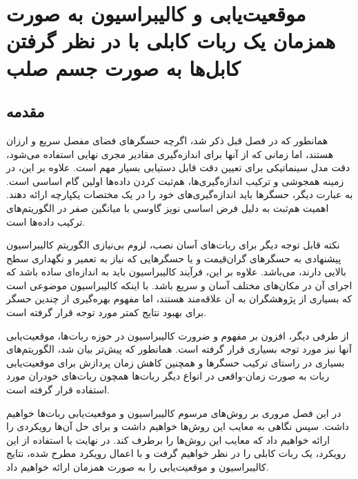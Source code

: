 \chapter{موقعیت‌یابی و کالیبراسیون به صورت همزمان یک ربات کابلی با در نظر گرفتن کابل‌ها به صورت جسم صلب}

\section{مقدمه}
همانطور که در فصل قبل ذکر شد، اگرچه حسگرهای فضای مفصل سریع و ارزان هستند، اما زمانی که از آنها برای اندازه‌گیری مقادیر مجری نهایی استفاده می‌شود، دقت مدل سینماتیکی برای تعیین دقت قابل دستیابی بسیار مهم است. علاوه بر این، در زمینه همجوشی و ترکیب اندازه‌گیری‌ها، هم‌ثبت کردن داده‌ها
\cite{hall1997introduction} 
 اولین گام اساسی است. به عبارت دیگر، حسگرها باید اندازه‌گیری‌های خود را در یک مختصات یکپارچه ارائه دهند. اهمیت هم‌ثبت به دلیل فرض اساسی نویز گاوسی با میانگین صفر در الگوریتم‌های ترکیب داده‌ها است.
 
 نکته قابل توجه دیگر برای ربات‌های آسان نصب، لزوم بی‌نیازی الگوریتم کالیبراسیون پیشنهادی به حسگرهای گران‌قیمت و یا حسگرهایی که نیاز به تعمیر و نگهداری سطح بالایی دارند، می‌باشد. علاوه بر این، فرآیند کالیبراسیون باید به اندازه‌ای ساده باشد که اجرای آن در مکان‌های مختلف آسان و سریع باشد. با اینکه کالیبراسیون موضوعی است که بسیاری از پژوهشگران به آن علاقه‌مند هستند، اما مفهوم بهره‌گیری از چندین حسگر برای بهبود نتایج کمتر مورد توجه قرار گرفته است.
 

از طرفی دیگر، افزون بر مفهوم و ضرورت کالیبراسیون در حوزه ربات‌ها، موقعیت‌یابی آنها نیز مورد توجه بسیاری قرار گرفته است. همانطور که پیش‌تر بیان شد، الگوریتم‌های بسیاری در راستای ترکیب حسگرها و همچنین کاهش زمان پردازش برای موقعیت‌یابی ربات به صورت زمان-واقعی در انواع دیگر ربات‌ها همچون ربات‌های خودران مورد استفاده قرار گرفته است.

در این فصل مروری بر روش‌های مرسوم کالیبراسیون و موقعیت‌یابی ربات‌ها خواهیم داشت. سپس نگاهی به معایب این روش‌ها خواهیم داشت و برای حل آن‌ها رویکردی را ارائه خواهیم داد که معایب این روش‌ها را برطرف کند. در نهایت با استفاده از این رویکرد، یک ربات کابلی را در نظر خواهیم گرفت و با اعمال رویکرد مطرح شده، نتایج کالیبراسیون و موقعیت‌یابی را به صورت همزمان ارائه خواهیم داد.

